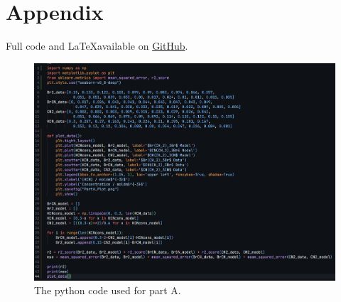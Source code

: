 \documentclass[twoside, 11pt]{article}
\begin{document}
\section{Appendix}
Full code and \LaTeX available on \href{https://github.com/joooshc/CHEM2029_MK2}{GitHub}.
\begin{figure}[H]
    \centering 
    \includegraphics[width=0.9\linewidth]{PartA.png}
    \caption{The python code used for part A.}
\end{figure}


\end{document}
